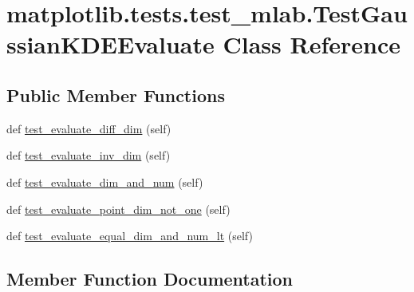 \hypertarget{classmatplotlib_1_1tests_1_1test__mlab_1_1TestGaussianKDEEvaluate}{}\section{matplotlib.\+tests.\+test\+\_\+mlab.\+Test\+Gaussian\+K\+D\+E\+Evaluate Class Reference}
\label{classmatplotlib_1_1tests_1_1test__mlab_1_1TestGaussianKDEEvaluate}
\subsection*{Public Member Functions}
\begin{DoxyCompactItemize}
\item 
def \hyperlink{classmatplotlib_1_1tests_1_1test__mlab_1_1TestGaussianKDEEvaluate_a209375ab0c154f9b90c0c472187d3b3d}{test\+\_\+evaluate\+\_\+diff\+\_\+dim} (self)
\item 
def \hyperlink{classmatplotlib_1_1tests_1_1test__mlab_1_1TestGaussianKDEEvaluate_a9a98ed126820f38da261720524121cb4}{test\+\_\+evaluate\+\_\+inv\+\_\+dim} (self)
\item 
def \hyperlink{classmatplotlib_1_1tests_1_1test__mlab_1_1TestGaussianKDEEvaluate_a086b08ba1b2cfc8256edd3bb18c8b20b}{test\+\_\+evaluate\+\_\+dim\+\_\+and\+\_\+num} (self)
\item 
def \hyperlink{classmatplotlib_1_1tests_1_1test__mlab_1_1TestGaussianKDEEvaluate_a00287851f0bf09bc59ae9c3a88c369f6}{test\+\_\+evaluate\+\_\+point\+\_\+dim\+\_\+not\+\_\+one} (self)
\item 
def \hyperlink{classmatplotlib_1_1tests_1_1test__mlab_1_1TestGaussianKDEEvaluate_a3028d4ef2f9fe6068290dcbb35a82516}{test\+\_\+evaluate\+\_\+equal\+\_\+dim\+\_\+and\+\_\+num\+\_\+lt} (self)
\end{DoxyCompactItemize}


\subsection{Member Function Documentation}
\mbox{\label{classmatplotlib_1_1tests_1_1test__mlab_1_1TestGaussianKDEEvaluate_a209375ab0c154f9b90c0c472187d3b3d}} 
